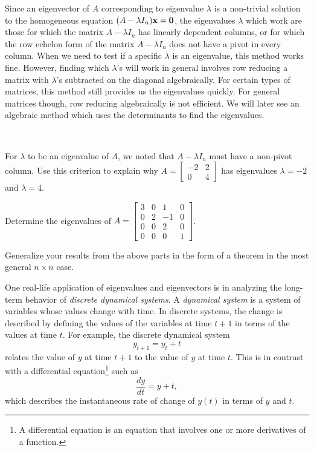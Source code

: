 Since an eigenvector of $A$ corresponding to eigenvalue $\lambda$ is a non-trivial solution to the homogeneous equation $(A - \lambda I_n)\mathbf{x} = \mathbf{0}$, the eigenvalues $\lambda$ which work are those for which the matrix $A-\lambda I_n$ has linearly dependent columns, or for which the row echelon form of the matrix $A-\lambda I_n$ does not have a pivot in every column. When we need to test if a specific $\lambda$ is an eigenvalue, this method works fine. However, finding which $\lambda$'s will work in general involves row reducing a matrix with $\lambda$'s subtracted on the diagonal algebraically. For certain types of matrices, this method still provides us the eigenvalues quickly. For general matrices though, row reducing algebraically is not efficient. We will later see an algebraic method which uses the determinants to find the eigenvalues.



\begin{activity} ~
\ba
\item For $\lambda$ to be an eigenvalue of $A$, we noted that $A-\lambda I_n$ must have a non-pivot column. Use this criterion to explain why $A=\left[ \begin{array}{rc} -2&2\\0&4 \end{array} \right]$ has eigenvalues $\lambda=-2$ and $\lambda=4$.



\item Determine the eigenvalues of $A = \left[ \begin{array}{ccrc} 3&0&1&0 \\ 0&2&-1&0 \\ 0&0&2&0 \\ 0&0&0&1 \end{array} \right]$. 



\item Generalize your results from the above parts in the form of a theorem in the most general $n\times n$ case.



\ea
\end{activity}


One real-life application of eigenvalues and eigenvectors is in analyzing the long-term behavior of \emph{discrete dynamical systems}. A \emph{dynamical system} is a system of variables whose values change with time. In discrete systems, the change is described by defining the values of the variables at time $t+1$ in terms of the values at time $t$. For example, the discrete dynamical system 
\[y_{t+1} = y_t + t\]
relates the value of $y$ at time $t+1$ to the value of $y$ at time $t$. This is in contrast with a differential equation\footnote{A differential equation is an equation that involves one or more derivatives of a function.}  such as  
\[ \frac{dy}{dt} = y+t,\]
which describes the instantaneous rate of change of $y(t)$ in terms of $y$ and $t$.

